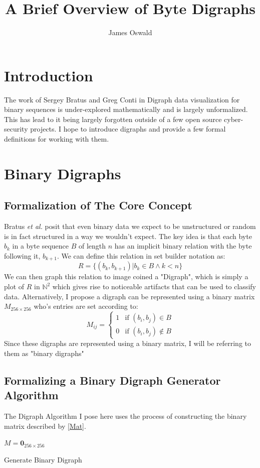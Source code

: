 \documentclass[12pt,a4paper]{article}
\begin{document}
\title{A Brief Overview of Byte Digraphs}
\author{James Oswald}

\maketitle

\section{Introduction}
The work of Sergey Bratus and Greg Conti in Digraph data visualization for binary sequences is under-explored mathematically and is largely unformalized. This has lead to it being largely forgotten outside of a few open source cyber-security projects. I hope to introduce digraphs and provide a few formal definitions for working with them. 

\section{Binary Digraphs}
\subsection{Formalization of The Core Concept}
Bratus \textit{et al.} posit that even binary data we expect to be unstructured or random is in fact structured in a way we wouldn't expect. The key idea is that each byte $b_k$ in a byte sequence $B$ of length $n$ has an implicit binary relation with the byte following it, $b_{k+1}$. We can define this relation in set builder notation as: 
\[
R = \{(b_k, b_{k+1})|b_k\in B \wedge k<n\} \tag{2.1} \label{Rel}
\]
We can then graph this relation to image coined a "Digraph", which is simply a plot of $R$ in $\mathbb{N}^2$ which gives rise to noticeable artifacts that can be used to classify data. Alternatively, I propose a digraph can be represented using a binary matrix $M_{256\times256}$  who's entries are set according to: 
\[
M_{ij} = 
\left\{
\begin{array}{ll}
1 & \mbox{if }(b_i, b_j)\in B \\
0 & \mbox{if }(b_i, b_j)\notin B
\end{array}
\right.
\tag{2.2} \label{Mat}
\]
Since these digraphs are represented using a binary matrix, I will be referring to them as "binary digraphs"

\pagebreak
\subsection{Formalizing a Binary Digraph Generator Algorithm}
The Digraph Algorithm I pose here uses the process of constructing the binary matrix described by \eqref{Mat}.
\begin{algorithm}
\DontPrintSemicolon
{}
\BlankLine
$M = \textbf{0}_{256\times256}$\;
\caption{Generate Binary Digraph}
\label{bdgA}
\end{algorithm}
\end{document}
